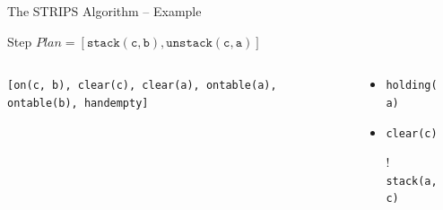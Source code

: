 \documentclass[presentation]{beamer}\mode<presentation>{\usetheme{AMSBolognaFC}}
\begin{document}
\begin{frame}[c]{The STRIPS Algorithm -- Example}
\small

\begin{exampleblock}{Step \nextStripsExampleStep{} \hfill $Plan = [\mathtt{stack(c,b),unstack(c,a)}]$}
    \begin{columns}[t]
        \begin{column}{.30\linewidth}\centering
            \texttt{[on(c, b), clear(c), clear(a), ontable(a), ontable(b), handempty]}
        \end{column}
        \begin{column}{.50\linewidth}\centering
            \begin{itemize}
                \item \texttt{holding(a)}
                \item \texttt{clear(c)}
                \item[!] \texttt{stack(a,c)}
            \end{itemize}
        \end{column}
        \begin{column}{.10\linewidth}\centering
            
        \end{column}
    \end{columns}
\end{exampleblock}

\end{frame}
\end{document}
